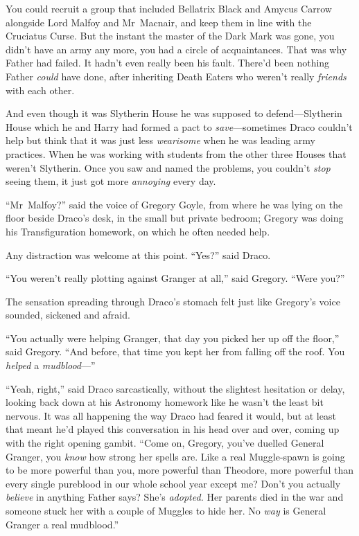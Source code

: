 You could recruit a group that included Bellatrix Black and Amycus Carrow alongside Lord Malfoy and Mr~Macnair, and keep them in line with the Cruciatus Curse. But the instant the master of the Dark Mark was gone, you didn’t have an army any more, you had a circle of acquaintances. That was why Father had failed. It hadn’t even really been his fault. There’d been nothing Father \emph{could} have done, after inheriting Death Eaters who weren’t really \emph{friends} with each other.

And even though it was Slytherin House he was supposed to defend—Slytherin House which he and Harry had formed a pact to \emph{save}—sometimes Draco couldn’t help but think that it was just less \emph{wearisome} when he was leading army practices. When he was working with students from the other three Houses that weren’t Slytherin. Once you saw and named the problems, you couldn’t \emph{stop} seeing them, it just got more \emph{annoying} every day.

“Mr~Malfoy?” said the voice of Gregory Goyle, from where he was lying on the floor beside Draco’s desk, in the small but private bedroom; Gregory was doing his Transfiguration homework, on which he often needed help.

Any distraction was welcome at this point. “Yes?” said Draco.

“You weren’t really plotting against Granger at all,” said Gregory. “Were you?”

The sensation spreading through Draco’s stomach felt just like Gregory’s voice sounded, sickened and afraid.

“You actually were helping Granger, that day you picked her up off the floor,” said Gregory. “And before, that time you kept her from falling off the roof. You \emph{helped} a \emph{mudblood}—”

“Yeah, right,” said Draco sarcastically, without the slightest hesitation or delay, looking back down at his Astronomy homework like he wasn’t the least bit nervous. It was all happening the way Draco had feared it would, but at least that meant he’d played this conversation in his head over and over, coming up with the right opening gambit. “Come on, Gregory, you’ve duelled General Granger, you \emph{know} how strong her spells are. Like a real Muggle-spawn is going to be more powerful than you, more powerful than Theodore, more powerful than every single pureblood in our whole school year except me? Don’t you actually \emph{believe} in anything Father says? She’s \emph{adopted.} Her parents died in the war and someone stuck her with a couple of Muggles to hide her. No \emph{way} is General Granger a real mudblood.”

